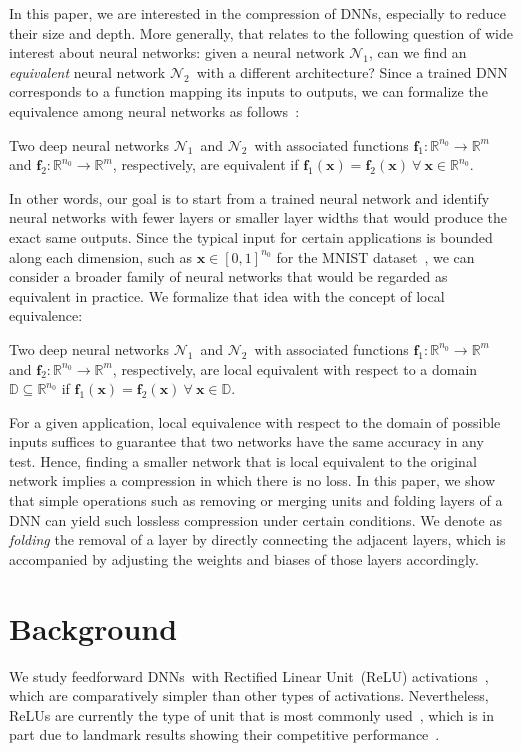 \documentclass[runningheads]{llncs}
\def\vf{{\bm{f}}}
\def\vx{{\bm{x}}}
\def\sD{{\mathbb{D}}}
\newcommand{\dnn}{\textsc{DNN} }
\newcommand{\dnns}{\textsc{DNN}s}
\newcommand{\dnnone}{$\mathcal{N}_1$}
\newcommand{\dnntwo}{$\mathcal{N}_2$}
\newcommand{\fone}{\vf_1}
\newcommand{\ftwo}{\vf_2}
\begin{document}
    In this paper, we are interested in the compression of \dnns, especially to reduce their size and depth. 
    More generally, that relates to the following question of wide interest about neural networks: given a neural network \dnnone, can we find an \emph{equivalent} neural network \dnntwo~with a different architecture? Since a trained \dnn corresponds to a function mapping its inputs to outputs, we can formalize the equivalence among neural networks as follows~\cite{BinarizedProperties}:
    \begin{definition}[Equivalence]
        Two deep neural networks \dnnone~and \dnntwo~with associated functions $\fone : \mathbb{R}^{n_0}\rightarrow \mathbb{R}^{m}$ and $\ftwo : \mathbb{R}^{n_0}\rightarrow \mathbb{R}^{m}$, respectively, are equivalent if $\fone(\vx) = \ftwo(\vx) ~\forall~\vx \in \mathbb{R}^{n_0}$.
        \label{def:equivalent_networks_1}
    \end{definition}
    In other words, our goal is to start from a trained neural network and identify neural networks with fewer layers or smaller layer widths that would produce the exact same outputs. Since the typical input for certain applications is bounded along each dimension, such as $\vx \in [0,1]^{n_0}$ for the MNIST dataset~\cite{LeCun1998}, we can consider a broader family of neural networks that would be regarded as equivalent in practice. We formalize that idea with the concept of local equivalence:
    \begin{definition}
        Two deep neural networks \dnnone~and \dnntwo~with associated functions $\fone : \mathbb{R}^{n_0}\rightarrow \mathbb{R}^{m}$ and $\ftwo : \mathbb{R}^{n_0}\rightarrow \mathbb{R}^{m}$, respectively, are local equivalent with respect to a domain $\sD \subseteq \mathbb{R}^{n_0}$ if $\fone(\vx) = \ftwo(\vx) ~\forall~\vx \in \sD$.
        \label{def:equivalent_networks_2}
    \end{definition}

    For a given application, local equivalence with respect to the domain of possible inputs suffices to guarantee that two networks have the same accuracy in any test. Hence, finding a smaller network that is local equivalent to the original network implies a compression in which there is no loss. In this paper, we show that simple operations such as removing or merging units and folding layers of a \dnn can yield such lossless compression under certain conditions. We denote as \emph{folding} the removal of a layer by directly connecting the adjacent layers, which is accompanied by adjusting the weights and biases of those layers accordingly.  \section{Background}
    We study feedforward \dnns~with Rectified Linear Unit~(ReLU) activations~\cite{OriginReLU}, which are comparatively simpler than other types of activations. Nevertheless, ReLUs are currently the type of unit that is most commonly used~\cite{CurrentDNN}, which is in part due to landmark results showing their  competitive performance~\cite{nair2010rectified,ReLUGood2}.  
    
\end{document}
